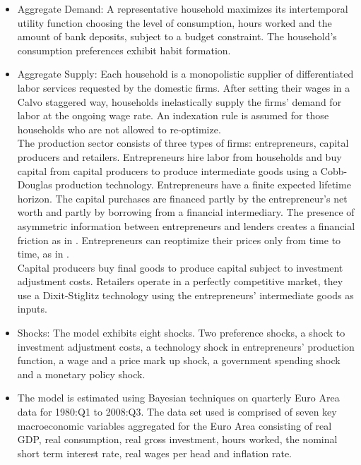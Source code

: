 \documentclass[11pt,a4paper]{article}
\begin{document}
	\begin{itemize}
		\item Aggregate Demand: A representative household maximizes its intertemporal utility function choosing the level of consumption, hours worked and the amount of bank deposits, subject to a budget constraint. The household's consumption preferences exhibit habit formation.
		
		\item Aggregate Supply: Each household is a monopolistic supplier of differentiated labor services requested by the domestic firms. After setting their wages in a Calvo staggered way, households inelastically supply the firms' demand for labor at the ongoing wage rate. An indexation rule is assumed for those households who are not allowed to re-optimize. \\
		The production sector consists of three types of firms: entrepreneurs, capital producers and retailers. Entrepreneurs hire labor from households and buy capital from capital producers to produce intermediate goods using a Cobb-Douglas production technology. Entrepreneurs have a finite expected lifetime horizon. The capital purchases are financed partly by the entrepreneur's net worth and partly by borrowing from a financial intermediary. The presence of asymmetric information between entrepreneurs and lenders creates a financial friction as in \cite{BernankeGertlerGilchrist1999}. Entrepreneurs can reoptimize their prices only from time to time, as in \cite{Calvo1983}. \\
		Capital producers buy final goods to produce capital subject to investment adjustment costs. Retailers operate in a perfectly competitive market, they use a Dixit-Stiglitz technology using the entrepreneurs' intermediate goods as inputs.
		
		\item Shocks: The model exhibits eight shocks. Two preference shocks, a shock to investment adjustment costs, a technology shock in entrepreneurs' production function, a wage and a price mark up shock, a government spending shock and a monetary policy shock.
		
		\item The model is estimated using Bayesian techniques on quarterly Euro Area data for 1980:Q1 to 2008:Q3.
		The data set used is comprised of seven key macroeconomic variables aggregated for the Euro Area consisting of real GDP, real consumption, real gross investment, hours worked, the nominal short term interest rate, real wages per head and inflation rate.
		
	\end{itemize}
	
\end{document}
